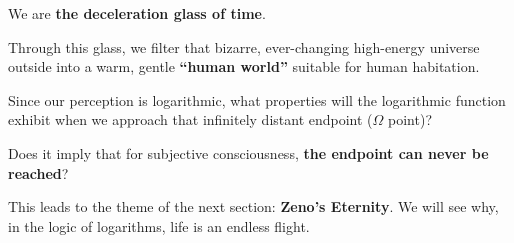 We are \textbf{the deceleration glass of time}.

Through this glass, we filter that bizarre, ever-changing high-energy universe outside into a warm, gentle \textbf{``human world''} suitable for human habitation.

Since our perception is logarithmic, what properties will the logarithmic function exhibit when we approach that infinitely distant endpoint ($\Omega$ point)?

Does it imply that for subjective consciousness, \textbf{the endpoint can never be reached}?

This leads to the theme of the next section: \textbf{Zeno's Eternity}. We will see why, in the logic of logarithms, life is an endless flight.

